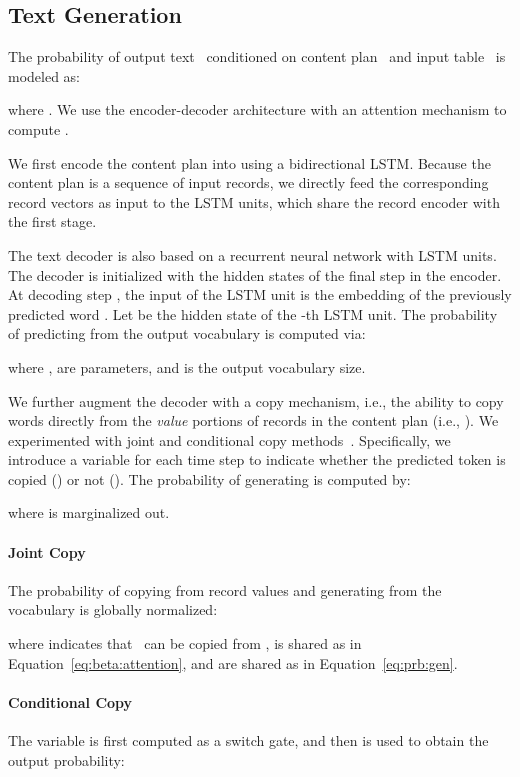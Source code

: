 \documentclass[letterpaper]{article} \usepackage{aaai19}  \usepackage{times}  \usepackage{helvet}  \usepackage{courier}  \usepackage{url}  \usepackage{graphicx}  \frenchspacing  \setlength{\pdfpagewidth}{8.5in}  \setlength{\pdfpageheight}{11in}  \graphicspath{ {images/} }
\begin{document}
\subsection{Text Generation}
The probability of output text~ conditioned on content plan~ and
input table~ is modeled as:

where .
We use the encoder-decoder architecture with an attention mechanism to compute .

We first encode the content plan  into
 using a bidirectional LSTM. Because
the content plan is a sequence of input records, we directly feed the
corresponding record vectors  as
input to the LSTM units, which share the record encoder with the first
stage.

The text decoder is also based on a recurrent neural network with LSTM units.
The decoder is initialized with the hidden states of the final step in the encoder.
At decoding step , the input of the LSTM unit is the embedding of the previously predicted word .
Let  be the hidden state of the -th LSTM unit.
The probability of predicting  from the output vocabulary is computed via:

where ,  are parameters, and  is the output vocabulary size.



We further augment the decoder with a copy mechanism, i.e., the ability to
copy words directly from the \emph{value} portions of records in the content plan (i.e., ).
We experimented with joint \cite{P16-1154} and conditional
copy methods~\cite{P16-1014}.
Specifically, we introduce a variable  for each time step to indicate whether the predicted token  is copied () or not ().
The probability of generating  is computed by:

where  is marginalized out.

\paragraph{Joint Copy}
The probability of copying from record values and generating from
the vocabulary is globally normalized:

where  indicates that~ can be copied from ,  is shared as in Equation~\eqref{eq:beta:attention}, and  are shared as in Equation~\eqref{eq:prb:gen}.

\paragraph{Conditional Copy}
The variable  is first computed as a switch gate, and then is used to obtain the output probability:
\end{document}
